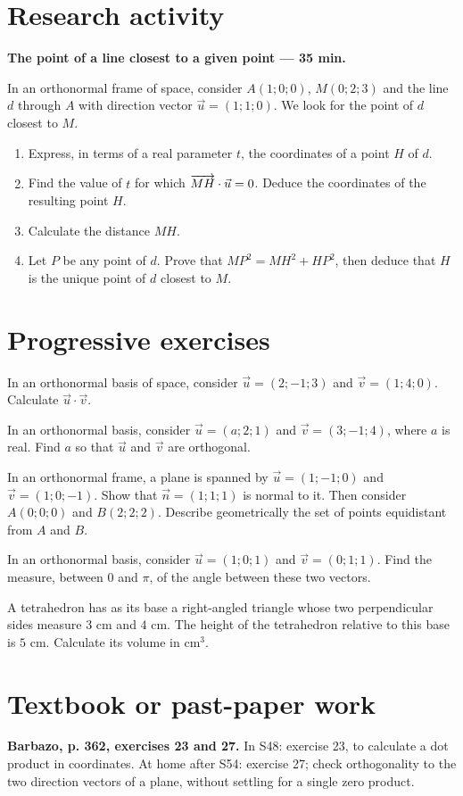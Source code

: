 \section{Research activity}\textbf{The point of a line closest to a given point --- 35 min.}\par In an orthonormal frame of space, consider $A(1;0;0)$, $M(0;2;3)$ and the line $d$ through $A$ with direction vector $\vec u=(1;1;0)$. We look for the point of $d$ closest to $M$.
\begin{enumerate}\item Express, in terms of a real parameter $t$, the coordinates of a point $H$ of $d$.
\item Find the value of $t$ for which $\overrightarrow{MH}\cdot\vec u=0$. Deduce the coordinates of the resulting point $H$.
\item Calculate the distance $MH$.
\item Let $P$ be any point of $d$. Prove that $MP^2=MH^2+HP^2$, then deduce that $H$ is the unique point of $d$ closest to $M$.\end{enumerate}

\section{Progressive exercises}

In an orthonormal basis of space, consider $\vec u=(2;-1;3)$ and $\vec v=(1;4;0)$. Calculate $\vec u\cdot\vec v$.

In an orthonormal basis, consider $\vec u=(a;2;1)$ and $\vec v=(3;-1;4)$, where $a$ is real. Find $a$ so that $\vec u$ and $\vec v$ are orthogonal.

In an orthonormal frame, a plane is spanned by $\vec u=(1;-1;0)$ and $\vec v=(1;0;-1)$. Show that $\vec n=(1;1;1)$ is normal to it. Then consider $A(0;0;0)$ and $B(2;2;2)$. Describe geometrically the set of points equidistant from $A$ and $B$.

In an orthonormal basis, consider $\vec u=(1;0;1)$ and $\vec v=(0;1;1)$. Find the measure, between $0$ and $\pi$, of the angle between these two vectors.

A tetrahedron has as its base a right-angled triangle whose two perpendicular sides measure $3$ cm and $4$ cm. The height of the tetrahedron relative to this base is $5$ cm. Calculate its volume in $\mathrm{cm}^3$.

\section{Textbook or past-paper work}\textbf{Barbazo, p. 362, exercises 23 and 27.} In S48: exercise 23, to calculate a dot product in coordinates. At home after S54: exercise 27; check orthogonality to the two direction vectors of a plane, without settling for a single zero product.

